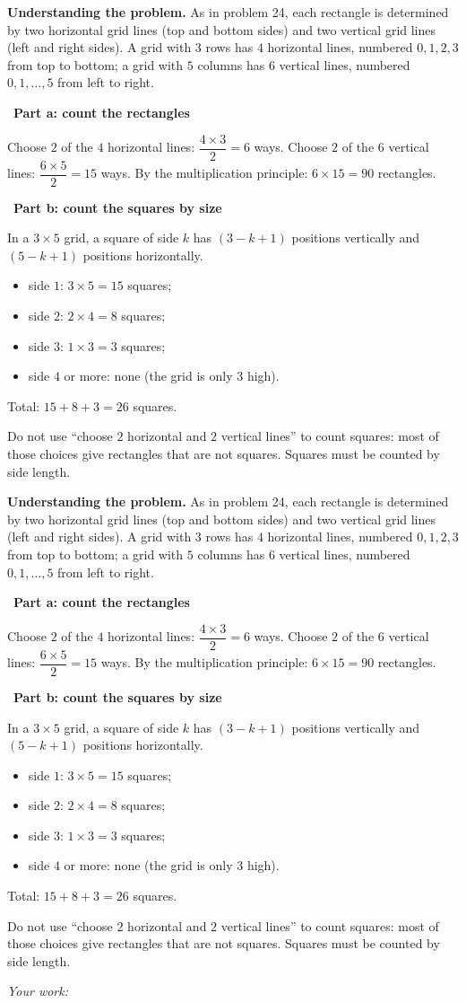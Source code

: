 \documentclass[11pt]{article}
\newif\ifsol \soltrue
\newcommand{\StuProb}[2]{\begin{probboxS}{#1}{#2}\StuProbBody\end{probboxS}}
\newcommand{\probsol}[1]{%
  \begin{lrbox}{\solmeasure}\begin{minipage}{\dimexpr\linewidth-24pt\relax}#1\end{minipage}\end{lrbox}%
  \ifsol
    \begin{solbox}#1\end{solbox}%
  \else
    \setlength{\solht}{\dimexpr\ht\solmeasure+\dp\solmeasure+0.85cm\relax}%
    \ifdim\solht<1.35cm\setlength{\solht}{1.35cm}\fi
    \ifdim\solht>\StudentMaxWork\setlength{\solht}{\StudentMaxWork}\fi
    \par\noindent\begin{minipage}{\linewidth}%
    \expandafter\StuProb\StuProbArgs
    \begin{tcolorbox}[colback=white,colframe=Line,boxrule=0.8pt,arc=5pt,
      left=8pt,right=8pt,top=4pt,bottom=4pt,height=\solht]{\footnotesize\color{Slate}\itshape\WorkWord}\end{tcolorbox}%
    \end{minipage}\par\medskip
  \fi}
\newlength{\StudentMaxWork}\setlength{\StudentMaxWork}{4.5cm}
\newcommand{\step}[2]{\par\smallskip\noindent{\bfseries\color{tmBlue!85!black}\StepWord~#1.}\ {\bfseries #2}\par\nopagebreak}
\def\WorkWord{Your work:}
\def\StepWord{Step}
\begin{document}
\probsol{
\textbf{Understanding the problem.} As in problem 24, each rectangle is determined by two horizontal grid lines (top and bottom sides) and
two vertical grid lines (left and right sides). A grid with $3$ rows has $4$ horizontal lines, numbered $0,1,2,3$ from top to bottom; a grid
with $5$ columns has $6$ vertical lines, numbered $0,1,\dots,5$ from left to right.

\step{1}{Part a: count the rectangles}
Choose $2$ of the $4$ horizontal lines: $\dfrac{4\times3}{2}=6$ ways. Choose $2$ of the $6$ vertical lines: $\dfrac{6\times5}{2}=15$ ways.
By the multiplication principle: $6\times15=90$ rectangles.

\step{2}{Part b: count the squares by size}
\begin{recallbox}In a $3\times5$ grid, a square of side $k$ has $(3-k+1)$ positions vertically and $(5-k+1)$ positions horizontally.\end{recallbox}
\begin{itemize}[leftmargin=1.2em,itemsep=1pt,topsep=2pt]
\item side $1$: $3\times5=15$ squares;
\item side $2$: $2\times4=8$ squares;
\item side $3$: $1\times3=3$ squares;
\item side $4$ or more: none (the grid is only $3$ high).
\end{itemize}
Total: $15+8+3=26$ squares.
\begin{warnbox}Do not use ``choose $2$ horizontal and $2$ vertical lines'' to count squares: most of those choices give rectangles that are not
squares. Squares must be counted by side length.\end{warnbox}

}
\end{document}
